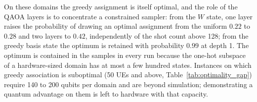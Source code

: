 On these domains the greedy assignment is itself optimal, and the role of the QAOA layers is to concentrate a
constrained sampler: from the $W$ state, one layer raises the probability of drawing an optimal assignment from the
uniform $0.22$ to $0.28$ and two layers to $0.42$, independently of the shot count above 128; from the greedy basis
state the optimum is retained with probability $0.99$ at depth 1. The optimum is contained in the samples in every run
because the one-hot subspace of a hardware-sized domain has at most a few hundred states. Instances on which greedy
association is suboptimal (50 UEs and above, Table~\ref{tab:optimality_gap}) require 140 to 200 qubits per domain and
are beyond simulation; demonstrating a quantum advantage on them is left to hardware with that capacity.
